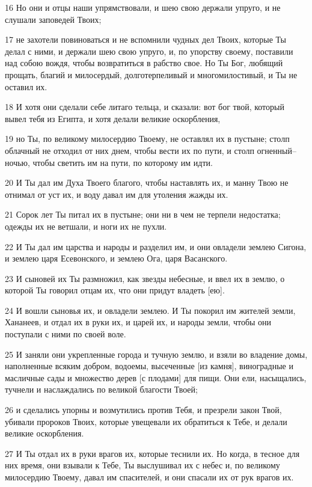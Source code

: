 \par 16 Но они и отцы наши упрямствовали, и шею свою держали упруго, и не слушали заповедей Твоих;
\par 17 не захотели повиноваться и не вспомнили чудных дел Твоих, которые Ты делал с ними, и держали шею свою упруго, и, по упорству своему, поставили над собою вождя, чтобы возвратиться в рабство свое. Но Ты Бог, любящий прощать, благий и милосердый, долготерпеливый и многомилостивый, и Ты не оставил их.
\par 18 И хотя они сделали себе литаго тельца, и сказали: вот бог твой, который вывел тебя из Египта, и хотя делали великие оскорбления,
\par 19 но Ты, по великому милосердию Твоему, не оставлял их в пустыне; столп облачный не отходил от них днем, чтобы вести их по пути, и столп огненный--ночью, чтобы светить им на пути, по которому им идти.
\par 20 И Ты дал им Духа Твоего благого, чтобы наставлять их, и манну Твою не отнимал от уст их, и воду давал им для утоления жажды их.
\par 21 Сорок лет Ты питал их в пустыне; они ни в чем не терпели недостатка; одежды их не ветшали, и ноги их не пухли.
\par 22 И Ты дал им царства и народы и разделил им, и они овладели землею Сигона, и землею царя Есевонского, и землею Ога, царя Васанского.
\par 23 И сыновей их Ты размножил, как звезды небесные, и ввел их в землю, о которой Ты говорил отцам их, что они придут владеть [ею].
\par 24 И вошли сыновья их, и овладели землею. И Ты покорил им жителей земли, Хананеев, и отдал их в руки их, и царей их, и народы земли, чтобы они поступали с ними по своей воле.
\par 25 И заняли они укрепленные города и тучную землю, и взяли во владение домы, наполненные всяким добром, водоемы, высеченные [из камня], виноградные и масличные сады и множество дерев [с плодами] для пищи. Они ели, насыщались, тучнели и наслаждались по великой благости Твоей;
\par 26 и сделались упорны и возмутились против Тебя, и презрели закон Твой, убивали пророков Твоих, которые увещевали их обратиться к Тебе, и делали великие оскорбления.
\par 27 И Ты отдал их в руки врагов их, которые теснили их. Но когда, в тесное для них время, они взывали к Тебе, Ты выслушивал их с небес и, по великому милосердию Твоему, давал им спасителей, и они спасали их от рук врагов их.
